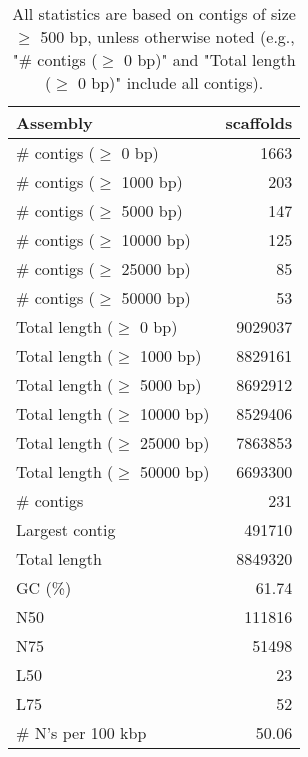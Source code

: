 \documentclass[12pt,a4paper]{article}
\begin{document}
\begin{table}[ht]
\begin{center}
\caption{All statistics are based on contigs of size $\geq$ 500 bp, unless otherwise noted (e.g., "\# contigs ($\geq$ 0 bp)" and "Total length ($\geq$ 0 bp)" include all contigs).}
\begin{tabular}{|l*{1}{|r}|}
\hline
Assembly & scaffolds \\ \hline
\# contigs ($\geq$ 0 bp) & 1663 \\ \hline
\# contigs ($\geq$ 1000 bp) & 203 \\ \hline
\# contigs ($\geq$ 5000 bp) & 147 \\ \hline
\# contigs ($\geq$ 10000 bp) & 125 \\ \hline
\# contigs ($\geq$ 25000 bp) & 85 \\ \hline
\# contigs ($\geq$ 50000 bp) & 53 \\ \hline
Total length ($\geq$ 0 bp) & 9029037 \\ \hline
Total length ($\geq$ 1000 bp) & 8829161 \\ \hline
Total length ($\geq$ 5000 bp) & 8692912 \\ \hline
Total length ($\geq$ 10000 bp) & 8529406 \\ \hline
Total length ($\geq$ 25000 bp) & 7863853 \\ \hline
Total length ($\geq$ 50000 bp) & 6693300 \\ \hline
\# contigs & 231 \\ \hline
Largest contig & 491710 \\ \hline
Total length & 8849320 \\ \hline
GC (\%) & 61.74 \\ \hline
N50 & 111816 \\ \hline
N75 & 51498 \\ \hline
L50 & 23 \\ \hline
L75 & 52 \\ \hline
\# N's per 100 kbp & 50.06 \\ \hline
\end{tabular}
\end{center}
\end{table}
\end{document}
